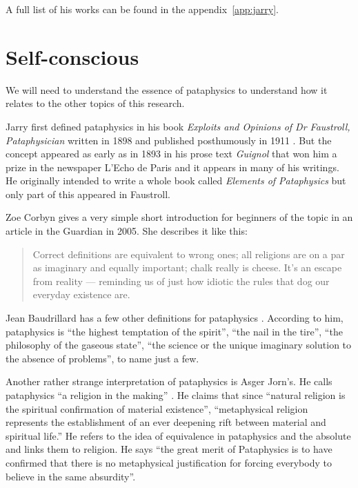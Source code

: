 A full list of his works can be found in the appendix~\ref{app:jarry}.


\section{Self-conscious}

We will need to understand the essence of pataphysics to understand how it relates to the other topics of this research.

Jarry first defined pataphysics in his book \textit{Exploits and Opinions of Dr Faustroll, Pataphysician} written in 1898 and published posthumously in 1911 \autocite{Jarry1996}. But the concept appeared as early as in 1893 in his prose text \textit{Guignol} that won him a prize in the newspaper L'Echo de Paris and it appears in many of his writings. He originally intended to write a whole book called \textit{Elements of Pataphysics} but only part of this appeared in Faustroll.

Zoe Corbyn gives a very simple short introduction for beginners of the topic in an article in the Guardian \citeyear{Corbyn2005} in 2005. She describes it like this:

\begin{quotation}
  Correct definitions are equivalent to wrong ones; all religions are on a par as imaginary and equally important; chalk really is cheese. It's an escape from reality --- reminding us of just how idiotic the rules that dog our everyday existence are. 
\end{quotation}

Jean Baudrillard has a few other definitions for pataphysics \citeyear{Baudrillard2007}. According to him, pataphysics is ``the highest temptation of the spirit'', ``the nail in the tire'', ``the philosophy of the gaseous state'', ``the science or the unique imaginary solution to the absence of problems'', to name just a few.

Another rather strange interpretation of pataphysics is Asger Jorn's. He calls pataphysics ``a religion in the making'' \autocite{Jorn1961}. He claims that since ``natural religion is the spiritual confirmation of material existence'', ``metaphysical religion represents the establishment of an ever deepening rift between material and spiritual life.'' He refers to the idea of equivalence in pataphysics and the absolute and links them to religion. He says ``the great merit of Pataphysics is to have confirmed that there is no metaphysical justification for forcing everybody to believe in the same absurdity''.


